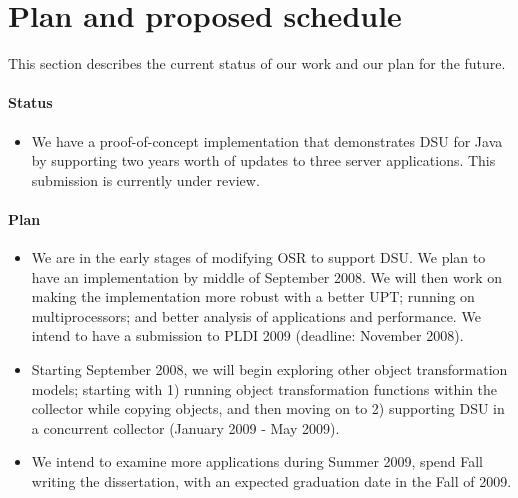 
\section{Plan and proposed schedule}
\label{sec:schedule}

This section describes the current status of our work and our plan for the
future.

\paragraph{Status}
\begin{itemize}
\item We have a proof-of-concept implementation that demonstrates \acf{DSU} for
Java by supporting two years worth of updates to three server applications.
This submission is currently under review.
\end{itemize}
\paragraph{Plan}
\begin{itemize}
\item We are in the early stages of modifying \acf{OSR} to support
\acs{DSU}. We plan to have an implementation by middle of September 2008.
We will then work on making the implementation more robust with a better \acf{UPT};
\DSU{} running on multiprocessors; and better analysis of applications and
performance. We intend to have a submission to PLDI 2009 (deadline:
November 2008).
\item Starting September 2008, we will begin exploring other object
transformation models; starting with 1) running object transformation
functions within the collector while copying objects, and then moving on to
2) supporting DSU in a concurrent collector (January 2009 - May 2009).
\item We intend to examine more applications during Summer 2009, spend Fall
writing the dissertation, with an expected graduation date in the Fall of
2009.
\end{itemize}

